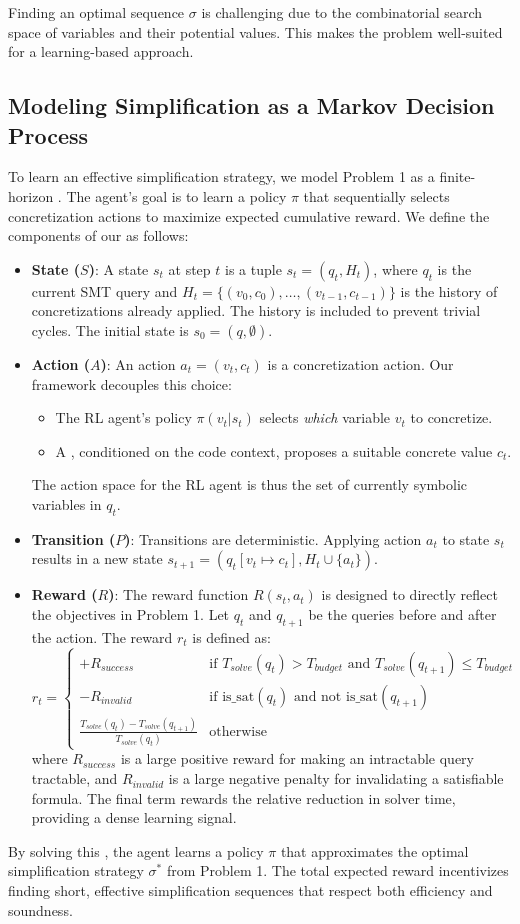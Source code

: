 Finding an optimal sequence $\sigma$ is challenging due to the combinatorial search space of variables and their potential values. This makes the problem well-suited for a learning-based approach.

\subsection{Modeling Simplification as a Markov Decision Process}
To learn an effective simplification strategy, we model Problem 1 as a finite-horizon \MDP{}. The agent's goal is to learn a policy $\pi$ that sequentially selects concretization actions to maximize expected cumulative reward. We define the components of our \MDP{} as follows:

\begin{itemize}
    \item \textbf{State ($S$)}: A state $s_t$ at step $t$ is a tuple $s_t = (q_t, H_t)$, where $q_t$ is the current SMT query and $H_t = \{(v_0, c_0), \dots, (v_{t-1}, c_{t-1})\}$ is the history of concretizations already applied. The history is included to prevent trivial cycles. The initial state is $s_0 = (q, \emptyset)$.

    \item \textbf{Action ($A$)}: An action $a_t = (v_t, c_t)$ is a concretization action. Our framework decouples this choice:
    \begin{itemize}
        \item The RL agent's policy $\pi(v_t | s_t)$ selects \textit{which} variable $v_t$ to concretize.
        \item A \LLM{}, conditioned on the code context, proposes a suitable concrete value $c_t$.
    \end{itemize}
    The action space for the RL agent is thus the set of currently symbolic variables in $q_t$.

    \item \textbf{Transition ($P$)}: Transitions are deterministic. Applying action $a_t$ to state $s_t$ results in a new state $s_{t+1} = (q_t[v_t \mapsto c_t], H_t \cup \{a_t\})$.

    \item \textbf{Reward ($R$)}: The reward function $R(s_t, a_t)$ is designed to directly reflect the objectives in Problem 1. Let $q_t$ and $q_{t+1}$ be the queries before and after the action. The reward $r_t$ is defined as:
    \[ r_t = \begin{cases} 
      +R_{success} & \text{if } T_{solve}(q_t) > T_{budget} \text{ and } T_{solve}(q_{t+1}) \le T_{budget} \\
      -R_{invalid} & \text{if } \text{is\_sat}(q_t) \text{ and not } \text{is\_sat}(q_{t+1}) \\
      \frac{T_{solve}(q_t) - T_{solve}(q_{t+1})}{T_{solve}(q_t)} & \text{otherwise}
   \end{cases}
	\]
    where $R_{success}$ is a large positive reward for making an intractable query tractable, and $R_{invalid}$ is a large negative penalty for invalidating a satisfiable formula. The final term rewards the relative reduction in solver time, providing a dense learning signal.
\end{itemize}

By solving this \MDP{}, the agent learns a policy $\pi$ that approximates the optimal simplification strategy $\sigma^*$ from Problem 1. The total expected reward incentivizes finding short, effective simplification sequences that respect both efficiency and soundness.

